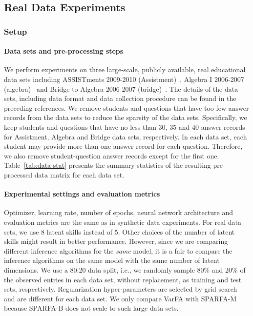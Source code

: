 \documentclass{edm_article}
\newcommand{\ml}[1]{\textcolor{orange}{\bf [LAN bandit: #1]}}
\newcommand{\jack}[1]{\textcolor{purple}{\bf [jack the ripper: #1]}}
\begin{document}
\subsection{Real Data Experiments}
\subsubsection{Setup}
\vspace{-10pt}
\paragraph{Data sets and pre-processing steps} We perform experiments on three large-scale, publicly available, real educational data sets including ASSISTments 
2009-2010 (Assistment)~\cite{assistment}, Algebra I 2006-2007 (algebra)~\cite{Algebra} and Bridge to Algebra 2006-2007 (bridge)~\cite{bridge,Stamper2016The2K}. The details of the data sets, including data format and data collection procedure can be found in the preceding references. We remove students and questions that have too few answer records from the data sets to reduce the sparsity of the data sets. Specifically, we keep students and questions that have no less than 30, 35 and 40 answer records for Assistment, Algebra and Bridge data sets, respectively. 
In each data set, each student may provide more than one answer record for each question. Therefore, we also remove student-question answer records except for the first one.
Table~\ref{tab:data-stat} presents the summary statistics of the resulting pre-processed data matrix for each data set. 

\vspace{-10pt}
\paragraph{Experimental settings and evaluation metrics} Optimizer, learning rate, number of epochs, neural network architecture and evaluation metrics are the same as in synthetic data experiments. For real data sets, we use 8 latent skills instead of 5. Other choices of the number of latent skills might result in better performance. However, since we are comparing different inference algorithms for the \textit{same} model, it is a fair to compare the inference algorithms on the same model with the same number of latent dimensions.
We use a 80:20 data split, i.e., we randomly sample 80\% and 20\% of the observed entries in each data set, without replacement, as training and test sets, respectively. Regularization hyper-parameters are selected by grid search and are different for each data set. We only compare VarFA with SPARFA-M because SPARFA-B does not scale to such large data sets. 
\end{document}
